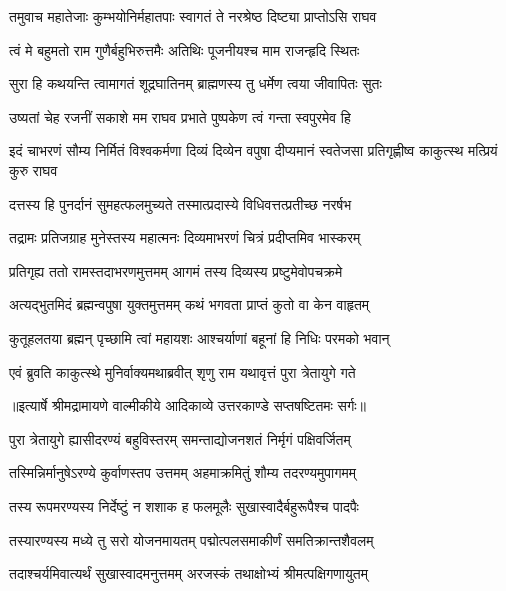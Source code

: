 \twolineshloka
{तमुवाच महातेजाः कुम्भयोनिर्महातपाः}
{स्वागतं ते नरश्रेष्ठ दिष्ट्या प्राप्तोऽसि राघव} %

\twolineshloka
{त्वं मे बहुमतो राम गुणैर्बहुभिरुत्तमैः}
{अतिथिः पूजनीयश्च माम राजन्हृदि स्थितः} %

\twolineshloka
{सुरा हि कथयन्ति त्वामागतं शूद्रघातिनम्}
{ब्राह्मणस्य तु धर्मेण त्वया जीवापितः सुतः} %

\twolineshloka
{उष्यतां चेह रजनीं सकाशे मम राघव}
{प्रभाते पुष्पकेण त्वं गन्ता स्वपुरमेव हि} %

\threelineshloka
{इदं चाभरणं सौम्य निर्मितं विश्वकर्मणा}
{दिव्यं दिव्येन वपुषा दीप्यमानं स्वतेजसा}
{प्रतिगृह्णीष्व काकुत्स्थ मत्प्रियं कुरु राघव} %

\twolineshloka
{दत्तस्य हि पुनर्दानं सुमहत्फलमुच्यते}
{तस्मात्प्रदास्ये विधिवत्तत्प्रतीच्छ नरर्षभ} %

\twolineshloka
{तद्रामः प्रतिजग्राह मुनेस्तस्य महात्मनः}
{दिव्यमाभरणं चित्रं प्रदीप्तमिव भास्करम्} %

\twolineshloka
{प्रतिगृह्य ततो रामस्तदाभरणमुत्तमम्}
{आगमं तस्य दिव्यस्य प्रष्टुमेवोपचक्रमे} %

\twolineshloka
{अत्यद्भुतमिदं ब्रह्मन्वपुषा युक्तमुत्तमम्}
{कथं भगवता प्राप्तं कुतो वा केन वाहृतम्} %

\twolineshloka
{कुतूहलतया ब्रह्मन् पृच्छामि त्वां महायशः}
{आश्चर्याणां बहूनां हि निधिः परमको भवान्} %

\twolineshloka
{एवं ब्रुवति काकुत्स्थे मुनिर्वाक्यमथाब्रवीत्}
{शृणु राम यथावृत्तं पुरा त्रेतायुगे गते} %


{॥इत्यार्षे श्रीमद्रामायणे वाल्मीकीये आदिकाव्ये उत्तरकाण्डे सप्तषष्टितमः सर्गः॥}


\twolineshloka
{पुरा त्रेतायुगे ह्यासीदरण्यं बहुविस्तरम्}
{समन्ताद्योजनशतं निर्मृगं पक्षिवर्जितम्} %

\twolineshloka
{तस्मिन्निर्मानुषेऽरण्ये कुर्वाणस्तप उत्तमम्}
{अहमाक्रमितुं शौम्य तदरण्यमुपागमम्} %

\twolineshloka
{तस्य रूपमरण्यस्य निर्देष्टुं न शशाक ह}
{फलमूलैः सुखास्वादैर्बहुरूपैश्च पादपैः} %

\twolineshloka
{तस्यारण्यस्य मध्ये तु सरो योजनमायतम्}
{पद्मोत्पलसमाकीर्णं समतिक्रान्तशैवलम्} %

\twolineshloka
{तदाश्चर्यमिवात्यर्थं सुखास्वादमनुत्तमम्}
{अरजस्कं तथाक्षोभ्यं श्रीमत्पक्षिगणायुतम्} %

